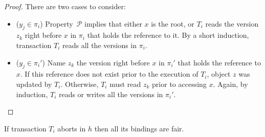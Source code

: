 \begin{proof}  

  There are two cases to consider:
  \begin{itemize}
  \item ($y_j \in \pi_i$)
    Property~$\mathcal{P}$ implies that either $x$ is the root, or $T_i$ reads the version $z_k$ right before $x$ in $\pi_i$ that holds the reference to it.
    By a short induction, transaction $T_i$ reads all the versions in $\pi_i$.
  \item ($y_j \in \pi_i'$)
    Name $z_k$ the version right before $x$ in $\pi_i'$ that holds the reference to $x$.
    If this reference does not exist prior to the execution of $T_i$, object $z$ was updated by $T_i$.
    Otherwise, $T_i$ must read $z_k$ prior to accessing $x$.
    Again, by induction, $T_i$ reads or writes all the versions in $\pi_i'$.
  \end{itemize}

\end{proof}

\begin{lemma}
  If transaction $T_i$ aborts in $h$ then all its bindings are fair.
\end{lemma}

